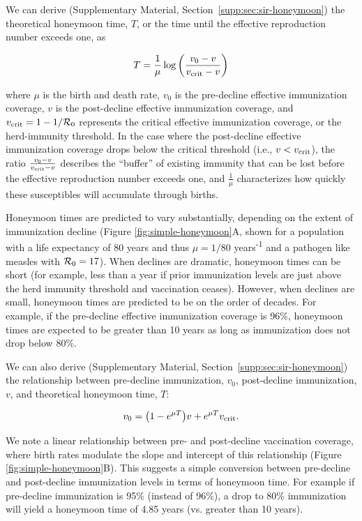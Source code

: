 We can derive (Supplementary Material, Section~\ref{supp:sec:sir-honeymoon}) the theoretical honeymoon time, $T$, or the time until the effective reproduction number exceeds one, as

\begin{equation}
\begin{aligned}
  T  = \frac{1}{\mu} \log\left(\frac{v_0-v}{v_{\mathrm{crit}}-v}\right)
\end{aligned}
\label{eq:honeymoon-time-main}
\end{equation}

\noindent
where $\mu$ is the birth and death rate, $v_0$ is the pre-decline effective immunization coverage, $v$ is the post-decline effective immunization coverage, and $v_{\mathrm{crit}} = 1-1/\mathcal{R}_{0}$ represents the critical effective immunization coverage, or the herd-immunity threshold. In the case where the post-decline effective immunization coverage drops below the critical threshold (i.e., $v < v_{\mathrm{crit}}$), the ratio $\frac{v_0-v}{v_{\mathrm{crit}}-v}$ describes the ``buffer'' of existing immunity that can be lost before the effective reproduction number exceeds one, and $\frac{1}{\mu}$ characterizes how quickly these susceptibles will accumulate through births.

Honeymoon times are predicted to vary substantially, depending on the extent of immunization decline (Figure \ref{fig:simple-honeymoon}A, shown for a population with a life expectancy of 80 years and thus $\mu = 1/80$ years\textsuperscript{-1} and a pathogen like measles with $\mathcal{R}_{0} = 17$). When declines are dramatic, honeymoon times can be short (for example, less than a year if prior immunization levels are just above the herd immunity threshold and vaccination ceases). However, when declines are small, honeymoon times are predicted to be on the order of decades. For example, if the pre-decline effective immunization coverage is 96\%, honeymoon times are expected to be greater than 10 years as long as immunization does not drop below 80\%. 

We can also derive (Supplementary Material, Section~\ref{supp:sec:sir-honeymoon}) the relationship between pre-decline immunization, $v_0$, post-decline immunization, $v$, and theoretical honeymoon time, $T$:

\begin{equation}
v_0=\bigl(1-e^{\mu T}\bigr)v+e^{\mu T}v_{\mathrm{crit}}.
\label{eq:coverage-isocline-main}
\end{equation}

\noindent
We note a linear relationship between pre- and post-decline vaccination coverage, where birth rates modulate the slope and intercept of this relationship (Figure \ref{fig:simple-honeymoon}B). This suggests a simple conversion between pre-decline and post-decline immunization levels in terms of honeymoon time. For example if pre-decline immunization is 95\% (instead of 96\%), a drop to 80\% immunization will yield a honeymoon time of 4.85 years (vs. greater than 10 years).


